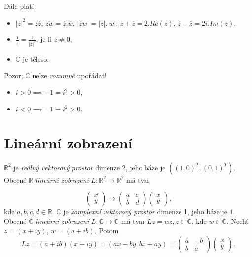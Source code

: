 Dále platí
\begin{itemize}
    \item $|z|^2 = z\overline{z}$, $\overline{zw} = \overline{z}.\overline{w}$, $|zw| = |z|.|w|$, $z+\overline{z} = 2.Re(z)$, $z-\overline{z} = 2i.Im(z)$,
    \item $\frac{1}{z} = \frac{\overline{z}}{|z|^2}$, je-li $z\neq 0$,
    \item $\mathbb{C}$ je těleso.
\end{itemize}

Pozor, $\mathbb{C}$ nelze \emph{rozumně} upořádat!
\begin{itemize}
    \item $i>0\implies -1=i^2>0$,
    \item $i<0\implies -1=i^2>0$.
\end{itemize}


\section{Lineární zobrazení}
\begin{definition}
$\mathbb{R}^2$ je \emph{reálný vektorový prostor} dimenze 2, jeho báze je $\left((1,0)^T, (0,1)^T\right)$. Obecné $\mathbb{R}$\emph{-lineární zobrazení} $L:\mathbb{R}^2\to\mathbb{R}^2$ má tvar 

\begin{equation}\label{eq:rLinearMap}
\begin{pmatrix}
x \\ y
\end{pmatrix}
\longmapsto
\begin{pmatrix}
a & c\\
b & d
\end{pmatrix}
\begin{pmatrix}
x \\ y
\end{pmatrix}
\text{,}
\end{equation}
kde $a,b,c,d\in\mathbb{R}$.
$\mathbb{C}$ je \emph{komplexní vektorový prostor} dimenze 1, jeho báze je $1$. Obecné $\mathbb{C}$\emph{-lineární zobrazení} $L:\mathbb{C}\to\mathbb{C}$ má tvar $Lz = wz, z\in\mathbb{C}$, kde $w\in\mathbb{C}$. Nechť $z = (x+iy)$, $ w=(a+ib)$. 
Potom $$Lz=(a+ib)(x+iy)= (ax-by, bx+ay) = 
\begin{pmatrix}
a & -b\\
b & a
\end{pmatrix}
\begin{pmatrix}
x \\ y
\end{pmatrix}\text{.}$$
\end{definition}

